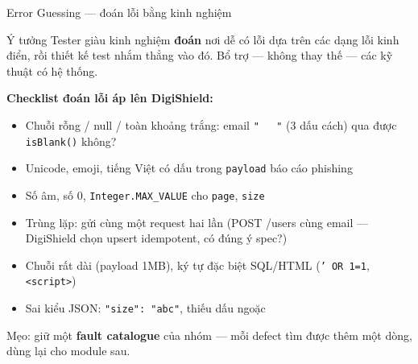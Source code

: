 \documentclass[aspectratio=169,12pt]{beamer}
\begin{document}
\begin{frame}[shrink=6]{Error Guessing --- đoán lỗi bằng kinh nghiệm}
  \begin{block}{Ý tưởng}
    Tester giàu kinh nghiệm \textbf{đoán} nơi dễ có lỗi dựa trên các
    dạng lỗi kinh điển, rồi thiết kế test nhắm thẳng vào đó.
    Bổ trợ --- không thay thế --- các kỹ thuật có hệ thống.
  \end{block}

  \vspace{0.2em}
  \small
  \textbf{Checklist đoán lỗi áp lên DigiShield:}
  \begin{itemize}
    \item Chuỗi rỗng / null / toàn khoảng trắng: email \texttt{"~~~"}
      (3 dấu cách) qua được \texttt{isBlank()} không?
    \item Unicode, emoji, tiếng Việt có dấu trong \texttt{payload} báo cáo phishing
    \item Số âm, số 0, \texttt{Integer.MAX\_VALUE} cho \texttt{page}, \texttt{size}
    \item Trùng lặp: gửi cùng một request hai lần (POST /users cùng email
      --- DigiShield chọn upsert idempotent, có đúng ý spec?)
    \item Chuỗi rất dài (payload 1MB), ký tự đặc biệt SQL/HTML
      (\texttt{' OR 1=1}, \texttt{<script>})
    \item Sai kiểu JSON: \texttt{"size": "abc"}, thiếu dấu ngoặc
  \end{itemize}

  \vspace{0.2em}
  {\small Mẹo: giữ một \textbf{fault catalogue} của nhóm --- mỗi defect tìm được
  thêm một dòng, dùng lại cho module sau.}
\end{frame}
\end{document}
